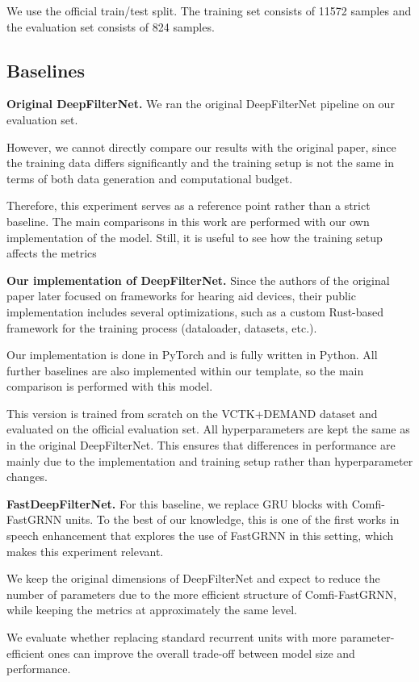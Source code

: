 \documentclass[a4paper,12pt]{extarticle}
\begin{document}
We use the official train/test split. The training set consists of 11572 samples and the
evaluation set consists of 824 samples.

\subsection{Baselines}

\textbf{Original DeepFilterNet.} We ran the original DeepFilterNet pipeline 
on our evaluation set.

However, we cannot directly compare our results with the original paper, since the training data 
differs significantly and the training setup is not the same in terms of both data generation and 
computational budget.


Therefore, this experiment serves as a reference point rather than a strict baseline. The main 
comparisons in this work are performed with our own implementation of the model. Still, it is useful
to see how the training setup affects the metrics

\textbf{Our implementation of DeepFilterNet.} Since the authors of the original paper later focused on 
frameworks for hearing aid devices, their public implementation includes several optimizations, such as a 
custom Rust-based framework for the training process (dataloader, datasets, etc.).

Our implementation is done in PyTorch and is fully written in Python. All further baselines are also 
implemented within our template, so the main comparison is performed with this model.

This version is trained from scratch on the VCTK+DEMAND dataset and evaluated on the official 
evaluation set. All hyperparameters are kept the same as in the original DeepFilterNet. This ensures that 
differences in performance are mainly due to the implementation and training setup rather than hyperparameter
changes.

\textbf{FastDeepFilterNet.} For this baseline, we replace GRU blocks with Comfi-FastGRNN units. To the best of
our knowledge, this is one of the first works in speech enhancement that explores the use of FastGRNN in this
setting, which makes this experiment relevant.

We keep the original dimensions of DeepFilterNet and expect to reduce the number of parameters due to the
more efficient structure of Comfi-FastGRNN, while keeping the metrics at approximately the same level.

We evaluate whether replacing standard recurrent units with more
parameter-efficient ones can improve the overall trade-off between model size and performance.
\end{document}
